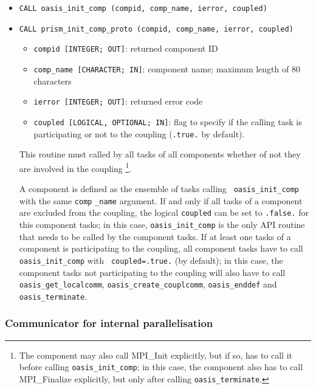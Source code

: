 \begin{itemize}

\item {\tt CALL oasis\_init\_comp (compid, comp\_name, ierror, coupled)}
\item {\tt CALL prism\_init\_comp\_proto (compid, comp\_name, ierror, coupled)}

  \begin{itemize}
  \item {\tt compid [INTEGER; OUT]}: returned component ID
  \item {\tt comp\_name [CHARACTER; IN]}: component name; maximum length of 80 characters 
  \item {\tt ierror [INTEGER; OUT]}: returned error code
  \item {\tt coupled [LOGICAL, OPTIONAL; IN]}: flag to specify if the calling task is participating or not to the coupling ({\tt .true.} by default). 

  \end{itemize}
 
  This routine must called by all tasks of all components whether of not they are involved in the coupling \footnote{The component may also call MPI\_Init explicitly, but if so, has to call it before calling {\tt oasis\_init\_comp}; in this case, the component also has to call MPI\_Finalize explicitly, but only after calling {\tt oasis\_terminate}.}. 

A component is defined as the ensemble of tasks  calling {\tt
  oasis\_init\_comp} with the same {\tt comp} {\tt \_name}
argument. If and only if all tasks of a component are excluded from
the coupling, the logical {\tt coupled} can be set to {\tt .false.}
for this component tasks; in this case, {\tt oasis\_init\_comp} is the
only API routine that needs to be called by the component tasks. If at
least one tasks of a component is participating to the coupling, all
component tasks have to call {\tt oasis\_init\_comp} with {\tt
  coupled=.true.} (by default); in this case, the component tasks not
participating to the coupling will also have to call
{\tt oasis\_get\_localcomm}, {\tt oasis\_create\_couplcomm}, {\tt oasis\_enddef} and {\tt oasis\_terminate}.
\end{itemize}

\subsubsection{Communicator for internal parallelisation}
\label{subsec_MPI1}

